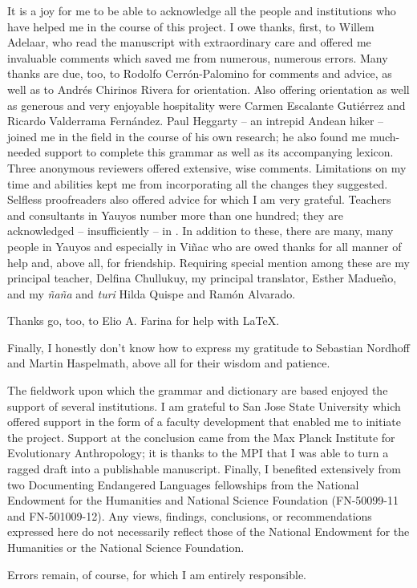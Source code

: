 \begin{refsection}
It is a joy for me to be able to acknowledge all the people and institutions who have helped me in the course of this project. I owe thanks, first, to Willem Adelaar, who read the manuscript with extraordinary care and offered me invaluable comments which saved me from numerous, numerous errors. Many thanks are due, too, to Rodolfo Cerr\'on-Palomino for comments and advice, as well as to Andr\'es Chirinos Rivera for orientation. Also offering orientation as well as generous and very enjoyable hospitality were Carmen Escalante Guti\'errez and Ricardo Valderrama Fern\'andez. Paul Heggarty -- an intrepid Andean hiker -- joined me in the field in the course of his own research; he also found me much-needed support to complete this grammar as well as its accompanying lexicon. Three anonymous reviewers offered extensive, wise comments. Limitations on my time and abilities kept me from incorporating all the changes they suggested. Selfless proofreaders also offered advice for which I am very grateful. Teachers and consultants in Yauyos number more than one hundred; they are acknowledged -- insufficiently -- in . In addition to these, there are many, many people in Yauyos and especially in Vi\~nac who are owed thanks for all manner of help and, above all, for friendship. Requiring special mention among these are my principal teacher, Delfina Chullukuy, my principal translator, Esther Madue\~no, and my \textit{\~na\~na} and \textit{turi} Hilda Quispe and Ram\'on Alvarado. 

Thanks go, too, to Elio A. Farina for help with \LaTeX.

Finally, I honestly don't know how to express my gratitude to Sebastian Nordhoff and Martin Haspelmath, above all for their wisdom and patience.

The fieldwork upon which the grammar and dictionary are based enjoyed the support of several institutions. I am grateful to San Jose State University which offered support in the form of a faculty development that enabled me to initiate the project. Support at the conclusion came from the Max Planck Institute for Evolutionary Anthropology; it is thanks to the MPI that I was able to turn a ragged draft into a publishable manuscript. Finally, I benefited extensively from two Documenting Endangered Languages fellowships from the National Endowment for the Humanities and National Science Foundation (FN-50099-11 and FN-501009-12). Any views, findings, conclusions, or recommendations expressed here do not necessarily reflect those of the National Endowment for the Humanities or the National Science Foundation.

Errors remain, of course, for which I am entirely responsible.
\end{refsection}
